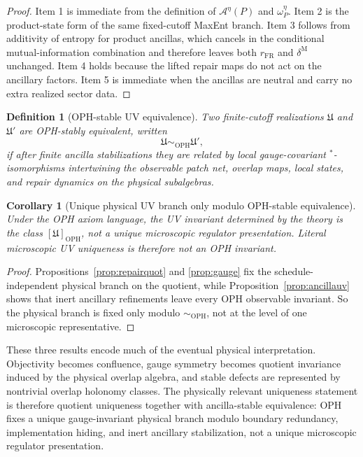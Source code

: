 \documentclass[11pt]{article}
\newtheorem{corollary}[theorem]{Corollary}
\newtheorem{definition}[theorem]{Definition}
\begin{document}
\begin{proof}
Item 1 is immediate from the definition of \(\mathcal A^\eta(P)\) and \(\omega_P^\eta\). Item 2 is the product-state form of the same fixed-cutoff MaxEnt branch. Item 3 follows from additivity of entropy for product ancillas, which cancels in the conditional mutual-information combination and therefore leaves both \(r_{\mathrm{FR}}\) and \(\delta^{\mathrm M}\) unchanged. Item 4 holds because the lifted repair maps do not act on the ancillary factors. Item 5 is immediate when the ancillas are neutral and carry no extra realized sector data.
\end{proof}

\begin{definition}[OPH-stable UV equivalence]\label{def:ophuveq}
Two finite-cutoff realizations \(\mathfrak U\) and \(\mathfrak U'\) are \emph{OPH-stably equivalent}, written
\[
\mathfrak U\sim_{\mathrm{OPH}}\mathfrak U',
\]
if after finite ancilla stabilizations they are related by local gauge-covariant \(^*\)-isomorphisms intertwining the observable patch net, overlap maps, local states, and repair dynamics on the physical subalgebras.
\end{definition}

\begin{corollary}[Unique physical UV branch only modulo OPH-stable equivalence]\label{cor:ophuveq}
Under the OPH axiom language, the UV invariant determined by the theory is the class \([\mathfrak U]_{\mathrm{OPH}}\), not a unique microscopic regulator presentation. Literal microscopic UV uniqueness is therefore not an OPH invariant.
\end{corollary}

\begin{proof}
Propositions~\ref{prop:repairquot} and \ref{prop:gauge} fix the schedule-independent physical
branch on the quotient, while Proposition~\ref{prop:ancillauv} shows that inert ancillary
refinements leave every OPH observable invariant. So the physical branch is fixed only modulo
\(\sim_{\mathrm{OPH}}\), not at the level of one microscopic representative.
\end{proof}

These three results encode much of the eventual physical interpretation. Objectivity becomes
confluence, gauge symmetry becomes quotient invariance induced by the physical overlap algebra, and
stable defects are represented by nontrivial overlap holonomy classes. The physically relevant
uniqueness statement is therefore quotient uniqueness together with ancilla-stable equivalence: OPH
fixes a unique gauge-invariant physical branch modulo boundary redundancy, implementation hiding,
and inert ancillary stabilization, not a unique microscopic regulator presentation.
\end{document}
